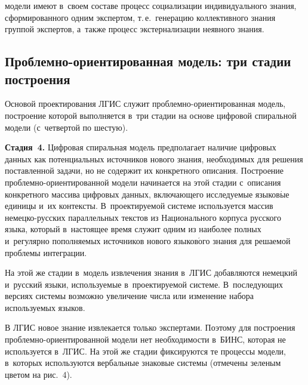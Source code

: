 \begin{multicols}{2}

\noindent
 модели 
имеют в~своем со\-ста\-ве процесс социализации индивидуального знания, 
сформированного одним экспертом, т.\,е.\ генерацию коллективного знания 
группой экспертов, а~также процесс экстернализации неявного знания.

\vspace*{-6pt}
  
  \subsection{Проблемно-ориентированная модель: три стадии 
построения} %

\vspace*{-3pt}
  
  Основой проектирования ЛГИС
служит проб\-лем\-но-ори\-ен\-ти\-ро\-ван\-ная модель, построение которой 
выполняется в~три стадии на основе циф\-ро\-вой спиральной модели (с~чет\-вер\-той 
по шес\-тую).
  
  \textbf{Стадия~4.} Цифровая спиральная модель предполагает наличие 
цифровых данных как потенциальных источников нового знания, необходимых 
для решения по\-став\-лен\-ной задачи, но не содержит их конкретного описания. 
Построение проб\-лем\-но-ори\-ен\-ти\-ро\-ван\-ной модели начинается на этой стадии 
с~описания конкретного массива циф\-ро\-вых данных, вклю\-ча\-юще\-го 
ис\-сле\-ду\-емые языков$\acute{\mbox{ы}}$е единицы и~их контексты. 
В~проектируемой сис\-те\-ме используется массив не\-мец\-ко-рус\-ских 
параллельных текс\-тов из Национального корпуса русского языка, который 
в~на\-сто\-ящее время служит одним из наиболее полных и~регулярно 
по\-пол\-ня\-емых источников нового языков$\acute{\mbox{о}}$го знания для 
решаемой проб\-ле\-мы интеграции.
  
  На этой же стадии в~модель извлечения знания в~ЛГИС добавляются немецкий и~русский языки, 
используемые в~проектируемой сис\-те\-ме. В~по\-сле\-ду\-ющих версиях  
сис\-те\-мы возможно увеличение чис\-ла или изменение набора ис\-поль\-зу\-емых 
языков.
  
  В ЛГИС новое знание извлекается только экспертами. Поэтому для 
построения проб\-лем\-но-ори\-ен\-ти\-ро\-ван\-ной модели нет не\-об\-хо\-ди\-мости 
в~БИНС, которая не используется в~ЛГИС. На этой же стадии фиксируются те 
процессы модели, в~которых используются вербальные знаковые сис\-те\-мы 
(отмечены зеленым цветом на рис.~4).

\smallskip
  

\end{multicols}

